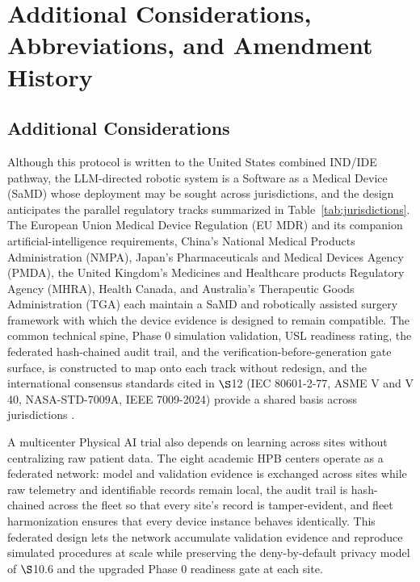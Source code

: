 \section{Additional Considerations, Abbreviations, and Amendment History}

\subsection{Additional Considerations}

Although this protocol is written to the United States combined IND/IDE pathway, the
LLM-directed robotic system is a Software as a Medical Device (SaMD) whose
deployment may be sought across jurisdictions, and the design anticipates the
parallel regulatory tracks summarized in Table~\ref{tab:jurisdictions}. The European
Union Medical Device Regulation (EU MDR) and its companion artificial-intelligence
requirements, China's National Medical Products Administration (NMPA), Japan's
Pharmaceuticals and Medical Devices Agency (PMDA), the United Kingdom's Medicines
and Healthcare products Regulatory Agency (MHRA), Health Canada, and Australia's
Therapeutic Goods Administration (TGA) each maintain a SaMD and robotically assisted
surgery framework with which the device evidence is designed to remain compatible.
The common technical spine, Phase 0 simulation validation, USL readiness rating, the
federated hash-chained audit trail, and the verification-before-generation gate
surface, is constructed to map onto each track without redesign, and the
international consensus standards cited in $\S$12 (IEC 80601-2-77, ASME V and V 40,
NASA-STD-7009A, IEEE 7009-2024) provide a shared basis across jurisdictions
\cite{iec8060127,asmevv40,nasastd7009,ieee7009}.

A multicenter Physical AI trial also depends on learning across sites without
centralizing raw patient data. The eight academic HPB centers operate as a federated
network: model and validation evidence is exchanged across sites while raw telemetry
and identifiable records remain local, the audit trail is hash-chained across the
fleet so that every site's record is tamper-evident, and fleet harmonization ensures
that every device instance behaves identically. This federated design lets the
network accumulate validation evidence and reproduce simulated procedures at scale
while preserving the deny-by-default privacy model of $\S$10.6 and the upgraded
Phase 0 readiness gate at each site.

